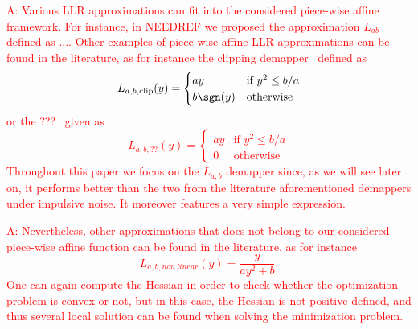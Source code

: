 \documentclass[a4paper]{IEEEtran}
\begin{document}
\textcolor{red}{A: 
Various LLR approximations can fit into the considered piece-wise affine framework. For instance, in NEEDREF we proposed the approximation $L_{ab}$ defined as ....
Other examples of piece-wise affine LLR
  approximations can be found in the literature, as for
  instance the clipping demapper~\cite{NEEDREF} defined as
  \begin{equation}
    \label{eq:1}
    L_{a,b,\text{clip}}(y)=
    \begin{cases}
      ay &\text{if $y^2\leq b/a$}\\
      b \sgn(y) &\text{otherwise}
    \end{cases}
  \end{equation}
  or the ???~\cite{NEEDREF} given as 
  \begin{equation}
    \label{eq:3}
    L_{a,b,\text{??}}(y)=
    \begin{cases}
      ay &\text{if  $y^2\leq b/a$}\\
      0 &\text{otherwise}
    \end{cases}  
  \end{equation}
  Throughout this paper we focus on the $L_{a,b}$ demapper
  since, as we will see later on, it performs better than
  the two from the literature aforementioned demappers under
  impulsive noise. It moreover features a very simple
  expression.}

\textcolor{red}{A: Nevertheless, other approximations that does not belong to our considered piece-wise affine function can be found in the literature, as for instance \begin{equation}
    L_{a,b,non\ linear}(y)=\frac{y}{ay^2+b}. 
    \label{eq:12c}
  \end{equation} 
One can again compute the Hessian in order to check whether the optimization problem is convex or not, but in this case, the Hessian is not positive defined, and thus several local solution can be found when solving the minimization problem.    
  }
\end{document}
